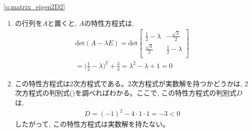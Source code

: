 % 
\ref{q:matrix_eigen2D2} 
\begin{enumerate}
\item {}の行列を$A$と置くと, $A$の特性方程式は, 
\begin{eqnarray*}
\text{det}(A-\lambda E)=
\text{det}
\begin{bmatrix}
\frac{1}{2}-\lambda & -\frac{\sqrt{3}}{2} \\
\frac{\sqrt{3}}{2} & \frac{1}{2}-\lambda \\
\end{bmatrix}\\
=\bigl(\frac{1}{2} - \lambda\bigr)^2 + \frac{3}{4}=\lambda^2 -\lambda +1=0
\end{eqnarray*}
\item この特性方程式は2次方程式である。2次方程式が実数解を持つかどうかは, 2次方程式の判別式()を調べればわかる。ここで, この特性方程式の判別式$D$は, 
\begin{eqnarray*}
D = (-1)^2 -4 \cdot 1 \cdot 1 = -3 < 0
\end{eqnarray*}
したがって, この特性方程式は実数解を持たない。
\end{enumerate}
\mv

